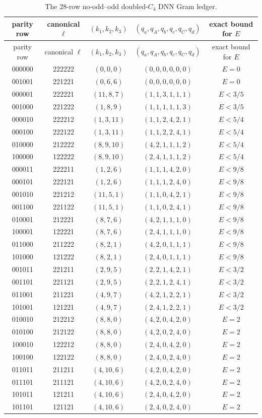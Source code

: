 \documentclass[11pt]{article}
\theoremstyle{remark}
\begin{document}
\begin{landscape}
\begin{longtable}{ccccc}
\caption{The $28$-row no-odd--odd doubled-$C_4$ DNN Gram ledger.}
\label{tab:dc4-complete}\\
\toprule
parity row&canonical $\ell$&$(k_1,k_2,k_3)$&$(q_a,q_A,q_b,q_c,q_C,q_d)$&exact bound for $E$\\
\midrule
\endfirsthead
\toprule
parity row&canonical $\ell$&$(k_1,k_2,k_3)$&$(q_a,q_A,q_b,q_c,q_C,q_d)$&exact bound for $E$\\
\midrule
\endhead
000000&222222&$(0,0,0)$&$(0,0,0,0,0,0)$&$E=0$\\
001001&221221&$(0,6,6)$&$(0,0,0,0,0,0)$&$E=0$\\
000001&222221&$(11,8,7)$&$(1,1,3,1,1,1)$&$E<3/5$\\
001000&221222&$(1,8,9)$&$(1,1,1,1,1,3)$&$E<3/5$\\
000010&222212&$(1,3,11)$&$(1,1,2,4,2,1)$&$E<5/4$\\
000100&222122&$(1,3,11)$&$(1,1,2,2,4,1)$&$E<5/4$\\
010000&212222&$(8,9,10)$&$(4,2,1,1,1,2)$&$E<5/4$\\
100000&122222&$(8,9,10)$&$(2,4,1,1,1,2)$&$E<5/4$\\
000011&222211&$(1,2,6)$&$(1,1,1,4,2,0)$&$E<9/8$\\
000101&222121&$(1,2,6)$&$(1,1,1,2,4,0)$&$E<9/8$\\
001010&221212&$(11,5,1)$&$(1,1,0,4,2,1)$&$E<9/8$\\
001100&221122&$(11,5,1)$&$(1,1,0,2,4,1)$&$E<9/8$\\
010001&212221&$(8,7,6)$&$(4,2,1,1,1,0)$&$E<9/8$\\
100001&122221&$(8,7,6)$&$(2,4,1,1,1,0)$&$E<9/8$\\
011000&211222&$(8,2,1)$&$(4,2,0,1,1,1)$&$E<9/8$\\
101000&121222&$(8,2,1)$&$(2,4,0,1,1,1)$&$E<9/8$\\
001011&221211&$(2,9,5)$&$(2,2,1,4,2,1)$&$E<3/2$\\
001101&221121&$(2,9,5)$&$(2,2,1,2,4,1)$&$E<3/2$\\
011001&211221&$(4,9,7)$&$(4,2,1,2,2,1)$&$E<3/2$\\
101001&121221&$(4,9,7)$&$(2,4,1,2,2,1)$&$E<3/2$\\
010010&212212&$(8,8,0)$&$(4,2,0,4,2,0)$&$E=2$\\
010100&212122&$(8,8,0)$&$(4,2,0,2,4,0)$&$E=2$\\
100010&122212&$(8,8,0)$&$(2,4,0,4,2,0)$&$E=2$\\
100100&122122&$(8,8,0)$&$(2,4,0,2,4,0)$&$E=2$\\
011011&211211&$(4,10,6)$&$(4,2,0,4,2,0)$&$E=2$\\
011101&211121&$(4,10,6)$&$(4,2,0,2,4,0)$&$E=2$\\
101011&121211&$(4,10,6)$&$(2,4,0,4,2,0)$&$E=2$\\
101101&121121&$(4,10,6)$&$(2,4,0,2,4,0)$&$E=2$\\
\bottomrule
\end{longtable}
\end{landscape}
\end{document}

